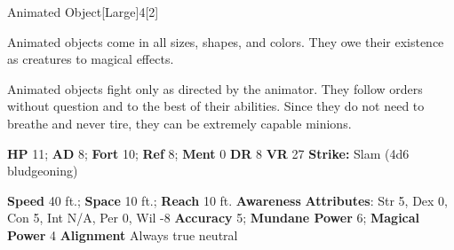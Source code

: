   
  \begin{monsection}{Animated Object}[Large]{4}[2]
    \vspace{-1em}\vspace{-1em}
    \vspace{0em}

    
    Animated objects come in all sizes, shapes, and colors. They owe their existence as creatures to magical effects.

    Animated objects fight only as directed by the animator. They follow orders without question and to the best of their abilities. Since they do not need to breathe and never tire, they can be extremely capable minions.
  
    

    \begin{spellcontent}
      \begin{spelltargetinginfo}
        \pari \textbf{HP} 11;
          \textbf{AD} 8;
          \textbf{Fort} 10;
          \textbf{Ref} 8;
          \textbf{Ment} 0
        \pari \textbf{DR} 8
        \pari \textbf{VR} 27
        \pari \textbf{Strike:}
            Slam  (4d6 bludgeoning)
      \end{spelltargetinginfo}
    \end{spellcontent}
    \begin{monsterfooter}
      \pari \textbf{Speed} 40 ft.;
        \textbf{Space} 10 ft.;
        \textbf{Reach} 10 ft.
      \pari \textbf{Awareness} 
      \pari \textbf{Attributes}:
        Str 5, Dex 0,
        Con 5, Int N/A,
        Per 0, Wil -8
      \pari \textbf{Accuracy} 5;
        \textbf{Mundane Power} 6;
      \textbf{Magical Power} 4
      \pari \textbf{Alignment} Always true neutral
    \end{monsterfooter}
  \end{monsection}
  
